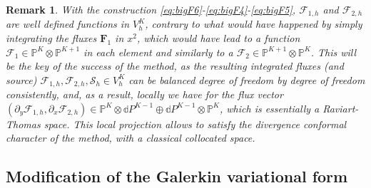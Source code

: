 \documentclass[a4paper,10pt]{article}
\newtheorem{remark}[theorem]{Remark}
\begin{document}
\begin{remark}
With the construction \eqref{eq:bigF6}-\eqref{eq:bigF4}-\eqref{eq:bigF5}, $\mathcal{F}_{1,h}$ and $\mathcal{F}_{2,h}$ are well defined functions in $V_h^K$, contrary to what would have happened by simply integrating the fluxes $\mathbf{F}_1$ in $x^2$, 
which would have lead to a function $\mathcal{F}_1 \in \mathbb P^{K} \otimes \mathbb P^{K+1}$ in each element and similarly to a $\mathcal{F}_2 \in \mathbb P^{K+1} \otimes \mathbb P^{K}$. 
This will be the key of the success of the method, as the resulting integrated fluxes (and source) $\mathcal{F}_{1,h}, \mathcal{F}_{2,h}, \mathcal{S}_h	 \in V_h^K$ can be balanced degree of freedom by degree of freedom consistently, 
and, as a result, locally we have for the flux vector $(\partial_y \mathcal{F}_{1,h}, \partial_x\mathcal{F}_{2,h}) \in  \mathbb P^{K} \otimes \mathbb dP^{K-1} \oplus  \mathbb dP^{K-1} \otimes \mathbb P^{K} $,
which is  essentially a Raviart-Thomas space. This local projection allows to satisfy the divergence conformal character of the method, with a classical collocated space.
\end{remark}



\subsection{Modification of the Galerkin variational form}
\end{document}
